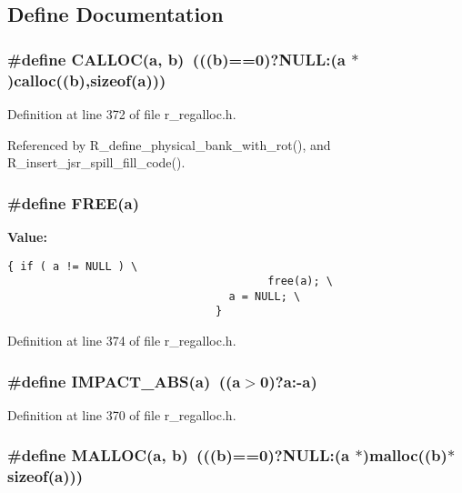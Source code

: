 \subsection{Define Documentation}
\subsubsection{\setlength{\rightskip}{0pt plus 5cm}\#define CALLOC(a, b)~(((b)==0)?NULL:(a $\ast$)calloc((b),sizeof(a)))}\label{r__regalloc_8h_dcd948b2b42aa0c9a8028dd260a8a6ca}




Definition at line 372 of file r\_\-regalloc.h.

Referenced by R\_\-define\_\-physical\_\-bank\_\-with\_\-rot(), and R\_\-insert\_\-jsr\_\-spill\_\-fill\_\-code().
\subsubsection{\setlength{\rightskip}{0pt plus 5cm}\#define FREE(a)}\label{r__regalloc_8h_834f31033781e091a3dbdfe16f7e8285}


\textbf{Value:}

\begin{Code}\begin{verbatim}{ if ( a != NULL ) \
                                        free(a); \
                                  a = NULL; \
                                }
\end{verbatim}\end{Code}


Definition at line 374 of file r\_\-regalloc.h.
\subsubsection{\setlength{\rightskip}{0pt plus 5cm}\#define IMPACT\_\-ABS(a)~((a$>$0)?a:-a)}\label{r__regalloc_8h_0b90a36fdada82d41f84f4e037d755b6}




Definition at line 370 of file r\_\-regalloc.h.
\subsubsection{\setlength{\rightskip}{0pt plus 5cm}\#define MALLOC(a, b)~(((b)==0)?NULL:(a $\ast$)malloc((b)$\ast$sizeof(a)))}\label{r__regalloc_8h_a22c214daeb745035df48608b773bcfd}




